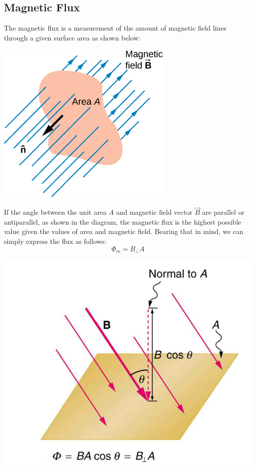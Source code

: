 \documentclass[9pt]{article}
\begin{document}
	\subsection*{Magnetic Flux}
	The magnetic flux is a measurement of the amount of magnetic field lines through a given surface area as shown below:
	\begin{center}
		\includegraphics[scale=0.6]{flux_area}
	\end{center}
	If the angle between the unit area $\hat{A}$ and magnetic field vector $\vec{B}$ are parallel or antiparallel, as shown in the diagram, the magnetic flux is the highest possible value given the values of area and magnetic field. Bearing that in mind, we can simply express the flux as follows:
	$$\Phi_m=B_\perp A$$
	\begin{center}
		\includegraphics[scale=0.18]{flux}
	\end{center}
\end{document}
